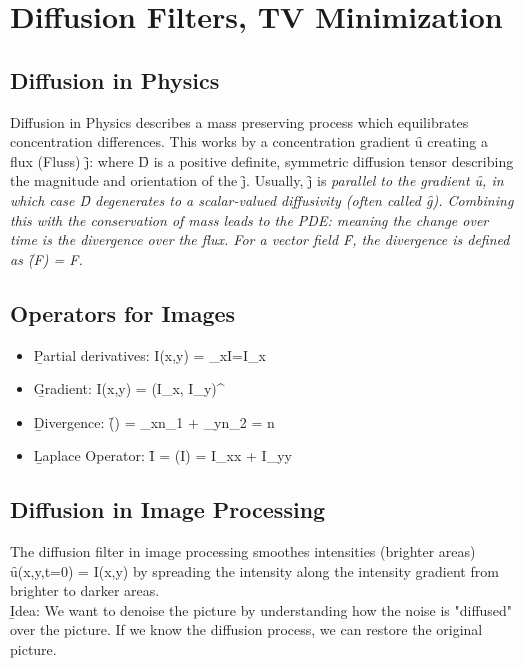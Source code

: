 \section{Diffusion Filters, TV Minimization}
\subsection{Diffusion in Physics}
Diffusion in Physics describes a mass preserving process which equilibrates concentration differences. This works by a concentration gradient \f{\nabla u} creating a flux (Fluss) \f{j}:
where \f{D} is a positive definite, symmetric diffusion tensor describing the magnitude and orientation of the \f{j}. Usually, \f{j} is \it{parallel} to the gradient \f{\nabla u}, in which case \f{D} degenerates to a scalar-valued diffusivity (often called \f{g}). Combining this with the conservation of mass leads to the PDE:
meaning the change over time is the divergence over the flux. For a vector field \f{F}, the divergence is defined as \f{(F) = \nabla F}.

\subsection{Operators for Images}
\begin{itemize}
    \item \b{Partial derivatives:}
    \f{
        I(x,y) = \delta_xI=I_x
    }
    \item \b{Gradient:}
    \f{
        \nabla I(x,y) = (I_x, I_y)^\top
    }
    \item \b{Divergence:} \f{() = \delta_xn_1 + \delta_yn_2 = \nabla n}
    \item \b{Laplace Operator:} \f{\Delta I = (\nabla I) = I_{xx} + I_{yy}}
\end{itemize}

\subsection{Diffusion in Image Processing}
The diffusion filter in image processing smoothes intensities (brighter areas) \f{u(x,y,t=0) = I(x,y)} by spreading the intensity along the intensity gradient from brighter to darker areas. \\
\b{Idea:} We want to denoise the picture by understanding how the noise is "diffused" over the picture. If we know the diffusion process, we can restore the original picture.\\


